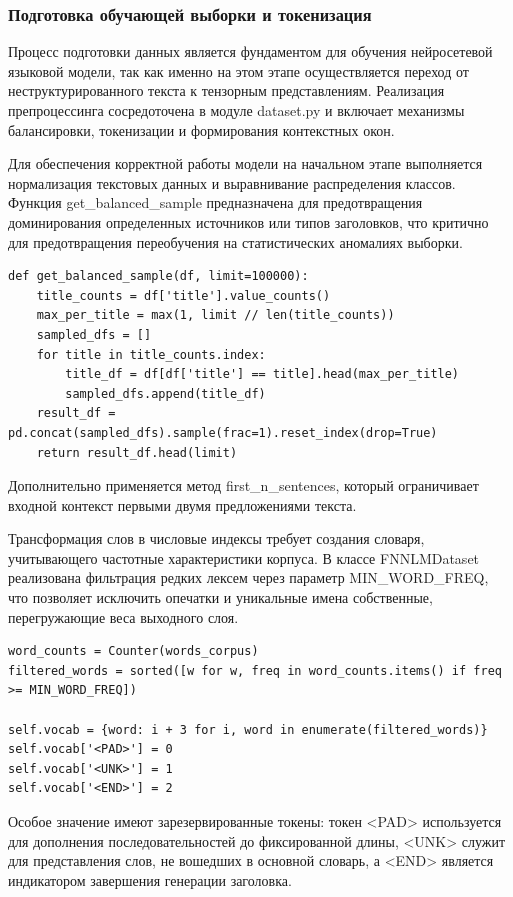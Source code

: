 \documentclass[coursework]{SCWorks}
\begin{document}
    \subsubsection{Подготовка обучающей выборки и токенизация}

    Процесс подготовки данных является фундаментом для обучения нейросетевой языковой модели,
    так как именно на этом этапе осуществляется переход от неструктурированного текста к тензорным представлениям.
    Реализация препроцессинга сосредоточена в модуле dataset.py и
    включает механизмы балансировки, токенизации и формирования контекстных окон.

    Для обеспечения корректной работы модели на начальном этапе выполняется нормализация текстовых данных
    и выравнивание распределения классов.
    Функция get\_balanced\_sample предназначена для предотвращения доминирования определенных источников
    или типов заголовков, что критично для предотвращения переобучения на статистических аномалиях выборки.
    \begin{verbatim}
def get_balanced_sample(df, limit=100000):
    title_counts = df['title'].value_counts()
    max_per_title = max(1, limit // len(title_counts))
    sampled_dfs = []
    for title in title_counts.index:
        title_df = df[df['title'] == title].head(max_per_title)
        sampled_dfs.append(title_df)
    result_df = pd.concat(sampled_dfs).sample(frac=1).reset_index(drop=True)
    return result_df.head(limit)
    \end{verbatim}


    Дополнительно применяется метод first\_n\_sentences, который ограничивает входной контекст первыми двумя предложениями текста.

    Трансформация слов в числовые индексы требует создания словаря, учитывающего частотные характеристики корпуса.
    В классе FNNLMDataset реализована фильтрация редких лексем через параметр MIN\_WORD\_FREQ,
    что позволяет исключить опечатки и уникальные имена собственные, перегружающие веса выходного слоя.
    \begin{verbatim}
word_counts = Counter(words_corpus)
filtered_words = sorted([w for w, freq in word_counts.items() if freq >= MIN_WORD_FREQ])

self.vocab = {word: i + 3 for i, word in enumerate(filtered_words)}
self.vocab['<PAD>'] = 0
self.vocab['<UNK>'] = 1
self.vocab['<END>'] = 2
    \end{verbatim}

    Особое значение имеют зарезервированные токены:
    токен <PAD> используется для дополнения последовательностей до фиксированной длины,
    <UNK> служит для представления слов, не вошедших в основной словарь,
    а <END> является индикатором завершения генерации заголовка.
\end{document}
